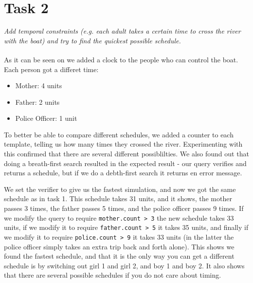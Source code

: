 \section{Task 2}
\label{sec:task2}
\textit{Add temporal constraints (e.g. each adult takes a certain time to cross the river with the boat) and try to find the quickest possible schedule.}\\\\
As it can be seen on  we added a clock to the people who can control the boat. Each person got a differet time:

\begin{itemize}
	\item Mother: 4 units
	\item Father: 2 units
	\item Police Officer: 1 unit
\end{itemize}

\noindent To better be able to compare different schedules, we added a counter to each template, telling us how many times they crossed the river. Experimenting with this confirmed that there are several different possiblilties. We also found out that doing a breath-first search resulted in the expected result - our query verifies and returns a schedule, but if we do a debth-first search it returns en error message.

\noindent We set the verifier to give us the fastest simulation, and now we got the same schedule as in task 1. This schedule takes 31 units, and it shows, the mother passes 3 times, the father passes 5 times, and the police officer passes 9 times. If we modify the query to require \texttt{mother.count > 3} the new schedule takes 33 units, if we modify it to require \texttt{father.count > 5} it takes 35 units, and finally if we modify it to require \texttt{police.count > 9} it takes 33 units (in the latter the police officer simply takes an extra trip back and forth alone). This shows we found the fastest schedule, and that it is the only way you can get a different schedule is by switching out girl 1 and girl 2, and boy 1 and boy 2. It also shows that there are several possible schedules if you do not care about timing.
